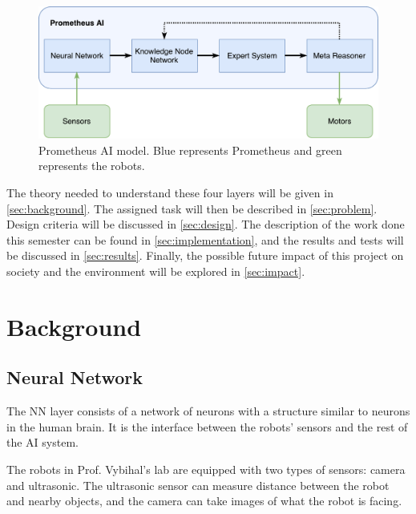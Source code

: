 \documentclass[titlepage,11pt]{article}
\begin{document}
\begin{figure}[!htb]
	\includegraphics[width=\columnwidth]{figures/ai_model.pdf}
	\caption[Prometheus AI model.]{Prometheus AI model. Blue represents Prometheus and green represents the robots.}
	\label{model}
\end{figure}

The theory needed to understand these four layers will be given in \autoref{sec:background}. The assigned task will then be described in \autoref{sec:problem}. Design criteria will be discussed in \autoref{sec:design}. The description of the work done this semester can be found in \autoref{sec:implementation}, and the results and tests will be discussed in \autoref{sec:results}. Finally, the possible future impact of this project on society and the environment will be explored in \autoref{sec:impact}.

\section{Background}
\label{sec:background}

\subsection{Neural Network}

The NN layer consists of a network of neurons with a structure similar to neurons in the human brain. It is the interface between the robots' sensors and the rest of the AI system.

The robots in Prof. Vybihal's lab are equipped with two types of sensors: camera and ultrasonic. The ultrasonic sensor can measure distance between the robot and nearby objects, and the camera can take images of what the robot is facing.
\end{document}
